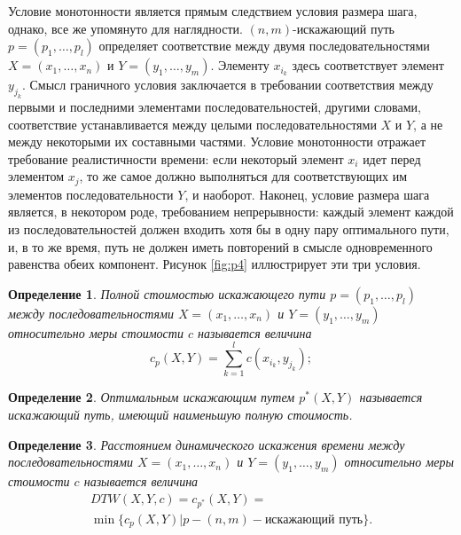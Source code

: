 \documentclass[a4paper, 14pt]{extarticle}
\numberwithin{figure}{subsection}
\numberwithin{equation}{subsection}
\newtheorem{definition}{Определение}[subsection]
\begin{document}
Условие монотонности является прямым следствием условия размера шага, однако, все же упомянуто для наглядности. $(n, m)$-искажающий путь $p=(p_1, \dots, p_l)$ определяет соответствие между двумя последовательностями $X=(x_1, \dots, x_n)$ и $Y=(y_1, \dots, y_m)$. Элементу $x_{i_k}$ здесь соответствует элемент $y_{j_k}$. Смысл граничного условия заключается в требовании соответствия между первыми и последними элементами последовательностей, другими словами, соответствие устанавливается между целыми последовательностями $X$ и $Y$, а не между некоторыми их составными частями. Условие монотонности отражает требование реалистичности времени: если некоторый элемент $x_i$ идет перед элементом $x_j$, то же самое должно выполняться для соответствующих им элементов последовательности $Y$, и наоборот. Наконец, условие размера шага является, в некотором роде, требованием непрерывности: каждый элемент каждой из последовательностей должен входить хотя бы в одну пару оптимального пути, и, в то же время, путь не должен иметь повторений в смысле одновременного равенства обеих компонент. Рисунок \ref{fig:p4} иллюстрирует эти три условия.

\begin{definition}
	Полной стоимостью искажающего пути $p=(p_1, \dots, p_l)$ между последовательностями $X = (x_1, \dots, x_n)$ и $Y = (y_1, \dots, y_m)$ относительно меры стоимости $c$ называется величина
\begin{equation}
	c_p(X, Y) = \sum_{k=1}^l c(x_{i_k}, y_{j_k});
\end{equation}
\end{definition}

\begin{definition}
	Оптимальным искажающим путем $p^*(X, Y)$ называется искажающий путь, имеющий наименьшую полную стоимость.
\end{definition}

\begin{definition}
	Расстоянием динамического искажения времени между последовательностями $X = (x_1, \dots, x_n)$ и $Y = (y_1, \dots, y_m)$ относительно меры стоимости $c$ называется величина
\begin{multline}
	DTW(X, Y, c) = c_{p^*}(X, Y) = \\ \min \{c_p(X, Y) | p - (n, m)-\text{искажающий путь}\}.
\end{multline}
\end{definition}
\end{document}
